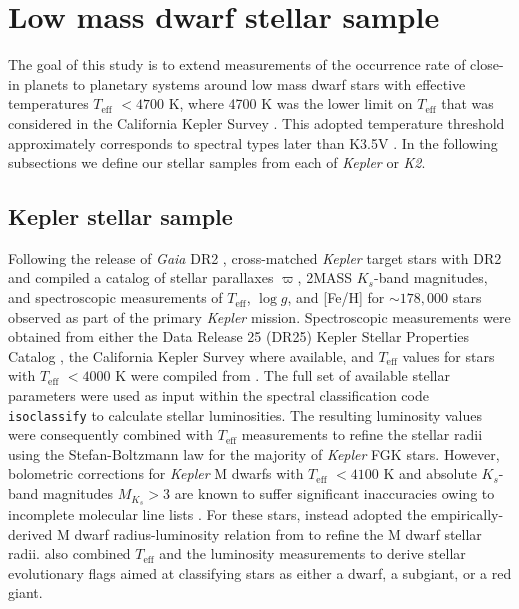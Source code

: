 \documentclass[twocolumn]{emulateapj}
\newcommand{\gaia}[1]{\emph{Gaia}#1}
\newcommand{\kepler}[1]{\emph{Kepler}#1}
\newcommand{\ktwo}[1]{\emph{K2}#1}
\newcommand{\teff}[1]{$T_{\text{eff}}$#1}
\newcommand{\logg}[1]{$\log{g}$#1}
\begin{document}
\section{Low mass dwarf stellar sample} \label{sect:stars}
The goal of this study is to extend measurements of the occurrence rate of close-in planets to planetary systems
around low mass dwarf stars with effective temperatures \teff{} $<4700$ K, where 4700 K was the lower limit on
\teff{} that was considered in the California Kepler Survey \citep[CKS;][]{fulton17}.
This adopted temperature threshold approximately corresponds to spectral types later than
K3.5V \citep{pecaut13}. In the following subsections we define our stellar samples from each of \kepler{} or \ktwo{.}

\subsection{Kepler stellar sample} \label{sect:kep}
Following the release of \gaia{} DR2 \citep{lindegren18}, \cite{berger18} cross-matched \kepler{} target stars
with DR2 and compiled a catalog of stellar
parallaxes $\varpi$, 2MASS $K_s$-band magnitudes, and spectroscopic measurements of \teff{,} \logg{,} and [Fe/H]
for $\sim 178,000$ stars observed as part of the primary \kepler{} mission. Spectroscopic measurements were obtained from
either the Data Release 25 (DR25)
Kepler Stellar Properties Catalog \citep[KSPC;][]{mathur17}, the California
Kepler Survey \citep[CKS;][]{petigura17} where available, and \teff{} values for stars with \teff{} $<4000$ K were compiled from
\cite{gaidos16}. The full set of available stellar parameters were used as input within the spectral classification code
\texttt{isoclassify} \citep{huber17} to calculate stellar luminosities. The resulting luminosity values were consequently combined
with \teff{} measurements to refine the stellar radii using the Stefan-Boltzmann law for the majority of \kepler{} FGK stars.
However, bolometric corrections for \kepler{} M dwarfs with \teff{} $<4100$ K
and absolute $K_s$-band magnitudes $M_{K_s}>3$ are known to suffer significant inaccuracies owing to incomplete
molecular line lists \citep{mann15}. For these stars, \cite{berger18} instead adopted the empirically-derived M dwarf radius-luminosity
relation from \cite{mann15} to refine the M dwarf stellar radii. \cite{berger18} also combined \teff{} and the 
luminosity measurements to derive stellar evolutionary flags aimed at classifying stars as either a dwarf, a subgiant, or a
red giant.
\end{document}
